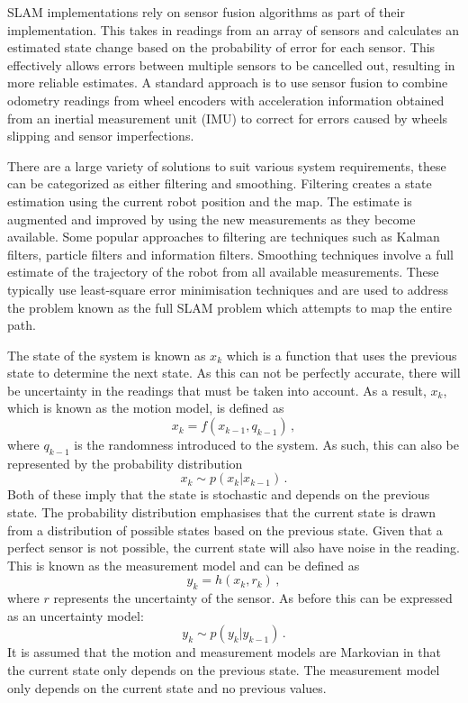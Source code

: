 SLAM implementations rely on sensor fusion algorithms as part of their implementation. 
This takes in readings from an array of sensors and calculates an estimated state change
based on the probability of error for each sensor. This effectively allows errors between 
multiple sensors to be cancelled out, resulting in more reliable estimates. A standard 
approach is to use sensor fusion to combine odometry readings from wheel encoders with 
acceleration information obtained from an inertial measurement unit (IMU) to correct for 
errors caused by wheels slipping and sensor imperfections.

There are a large variety of solutions to suit various system requirements, these
can be categorized as either filtering and smoothing. Filtering creates a state estimation 
using the current robot position and the map. The estimate is augmented and improved
by using the new measurements as they become available. Some popular
approaches to filtering are techniques such as Kalman filters, particle filters
and information filters. Smoothing techniques involve a full estimate of the trajectory of
the robot from all available measurements. These typically use least-square error 
minimisation techniques and are used to address the problem known as the full SLAM 
problem which attempts to map the entire path.

The state of the system is known as $x_k$ which is a function that uses the previous 
state to determine the next state. As this can not be perfectly accurate, there will 
be uncertainty in the readings that must be taken into account. As a result, $x_k$,
which is known as the motion model, is defined as
\begin{equation}
x_{k} = f(x_{k-1}, q_{k-1})\,,
\end{equation}
where $q_{k-1}$ is the randomness introduced to the system. As such, this can
also be represented by the probability distribution
\begin{equation}
x_{k} \sim p(x_{k} | x_{k-1})\,.
\end{equation}
Both of these imply that the state is stochastic and depends on the previous
state. The probability distribution emphasises that the current state is
drawn from a distribution of possible states based on the previous state. Given that a perfect sensor is not possible, the current state will also have noise
in the reading. This is known as the measurement model and can be defined as
\begin{equation}
y_{k} = h(x_{k}, r_{k})\,,
\end{equation}
where $r$ represents the uncertainty of the sensor. As
before this can be expressed as an uncertainty model:
\begin{equation}
y_{k} \sim p(y_{k} | y_{k-1})\,.
\end{equation}
It is assumed that the motion and measurement models are Markovian in that
the current state only depends on the previous state. The measurement model only
depends on the current state and no previous values.

